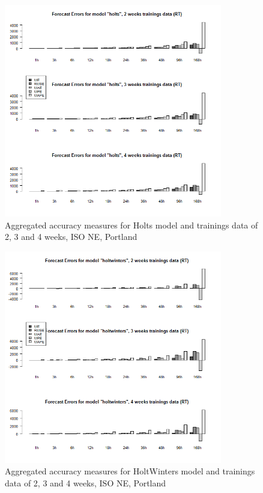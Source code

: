 \begin{figure}[!ht]
	\centering
		\includegraphics[width=0.85\textwidth]{figures/appendix_forecast_results/rt_sim_4_x_1w_1w_holts.png}
	\caption{Aggregated accuracy measures for Holts model and trainings data of 2, 3 and 4 weeks, ISO NE, Portland}
	\label{fig:app_rt_sim_4_x_1w_1w_holts}
	\vspace*{-1.6in}
\end{figure}




\begin{figure}[!ht]
	\centering
	\vspace*{-1.2in}
		\includegraphics[width=0.85\textwidth]{figures/appendix_forecast_results/rt_sim_4_x_1w_1w_holtwinters.png}
	\caption{Aggregated accuracy measures for HoltWinters model and trainings data of 2, 3 and 4 weeks, ISO NE, Portland}
	\label{fig:app_rt_sim_4_x_1w_1w_holtwinters}
\end{figure}

